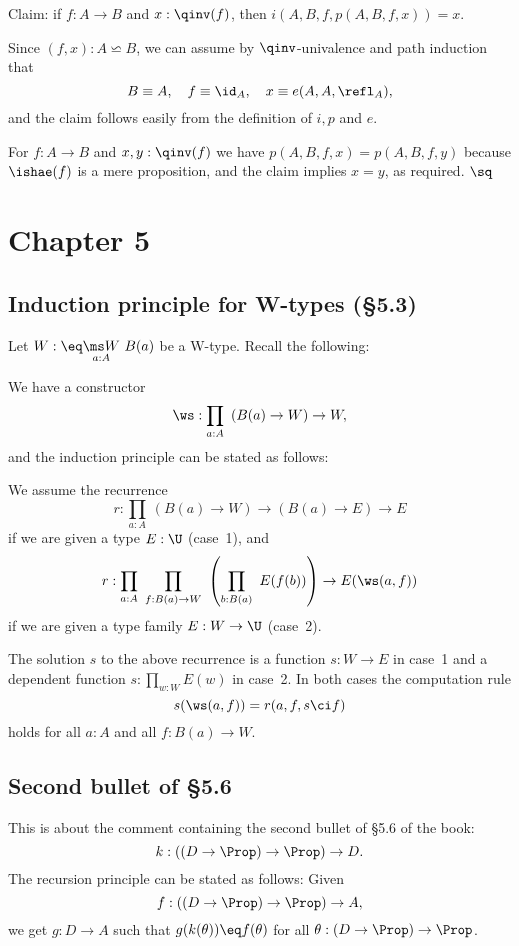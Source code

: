 \documentclass[12pt]{article}
\begin{document}
Claim: if $f:A\to B$ and $x:\qinv(f)$, then $i(A,B,f,p(A,B,f,x))=x$.
 
Since $(f,x):A\backsimeq B$, we can assume by $\qinv$-univalence and path induction that 
$$
B\equiv A,\quad f\equiv\id_A,\quad x\equiv e(A,A,\refl_A),
$$ 
and the claim follows easily from the definition of $i,p$ and $e$.

For $f:A\to B$ and $x,y:\qinv(f)$ we have $p(A,B,f,x)=p(A,B,f,y)$ because $\ishae(f)$ is a mere proposition, and the claim implies $x=y$, as required. $\sq$


\section{Chapter 5}

\subsection{Induction principle for W-types (\S5.3)}%

Let $W:\eq\underset{a:A}{\ms W}\ B(a)$ be a W-type. Recall the following: 

We have a constructor 
$$
\ws:\prod_{a:A}\ \left(B(a)\to W\right)\to W, 
$$ 
and the induction principle can be stated as follows:

We assume the recurrence 
$$
r:\prod_{a:A}\ (B(a)\to W)\to(B(a)\to E)\to E
$$ 
if we are given a type $E:\U$ (case~1), and 
$$
r:\prod_{a:A}\ \prod_{f:B(a)\to W}\ \left(\prod_{b:B(a)}\ E(f(b))\right)\to E(\ws(a,f))
$$ 
if we are given a type family $E:W\to\U$ (case~2). 

The solution $s$ to the above recurrence is a function $s:W\to E$ in case~1 and a dependent function $s:\prod_{w:W}E(w)$ in case~2. In both cases the computation rule 
$$
s(\ws(a,f))=r(a,f,s\ci f)
$$ 
holds for all $a:A$ and all $f:B(a)\to W$.


\subsection{Second bullet of \S5.6}%

This is about the comment containing the second bullet of \S5.6 of the book:
$$
k:((D\to\Prop)\to\Prop)\to D.
$$ 
The recursion principle can be stated as follows: Given 
$$
f:((D\to\Prop)\to\Prop)\to A,
$$ 
we get $g:D\to A$ such that $g(k(\theta))\eq f(\theta)$ for all $\theta:(D\to\Prop)\to\Prop$.
\end{document}
